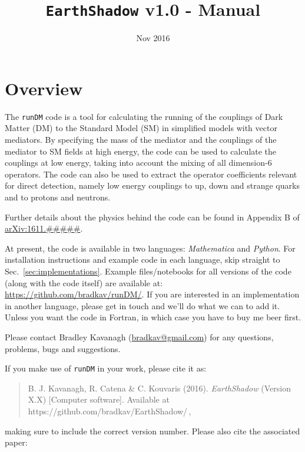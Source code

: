 \documentclass[notitlepage,12pt]{article}
\newcommand{\runDM}{\texttt{runDM}\xspace}
\newcommand{\EarthShadow}{\texttt{EarthShadow}\xspace}
\newcommand{\ourpaper}{\href{http://arxiv.org/abs/1611.#####}{arXiv:1611.#####}\xspace}
\begin{document}
\title{\EarthShadow v1.0 - Manual \\ \vspace{0.5cm}\normalsize}

\date{\vspace{-1cm} Nov 2016}

\maketitle

\tableofcontents

\section{Overview}



The \runDM code is a tool for calculating the running of the couplings of Dark Matter (DM) to the Standard Model (SM) in simplified models with vector mediators. By specifying the mass of the mediator and the couplings of the mediator to SM fields at high energy, the code can be used to calculate the couplings at low energy, taking into account the mixing of all dimension-6 operators. The code can also be used to extract the operator coefficients relevant for direct detection, namely low energy couplings to up, down and strange quarks and to protons and neutrons. 

Further details about the physics behind the code can be found in Appendix B of \ourpaper.

At present, the code is available in two languages: \textit{Mathematica} and \textit{Python}. For installation instructions and example code in each language, skip straight to Sec.~\ref{sec:implementations}. Example files/notebooks for all versions of the code (along with the code itself) are available at: \href{https://github.com/bradkav/runDM/}{https://github.com/bradkav/runDM/}. If you are interested in an implementation in another language, please get in touch and we'll do what we can to add it. Unless you want the code in Fortran, in which case you have to buy me beer first. 

Please contact Bradley Kavanagh (\href{mailto:bradkav@gmail.com?subject=EarthShadow v.10}{bradkav@gmail.com}) for any questions, problems, bugs and suggestions.

If you make use of \runDM in your work, please cite it as:

\begin{quote}
B. J. Kavanagh, R. Catena \& C. Kouvaris (2016). \textit{EarthShadow} (Version X.X) [Computer software]. Available at https://github.com/bradkav/EarthShadow/\,,
\end{quote}
making sure to include the correct version number. Please also cite the associated paper:
\end{document}

